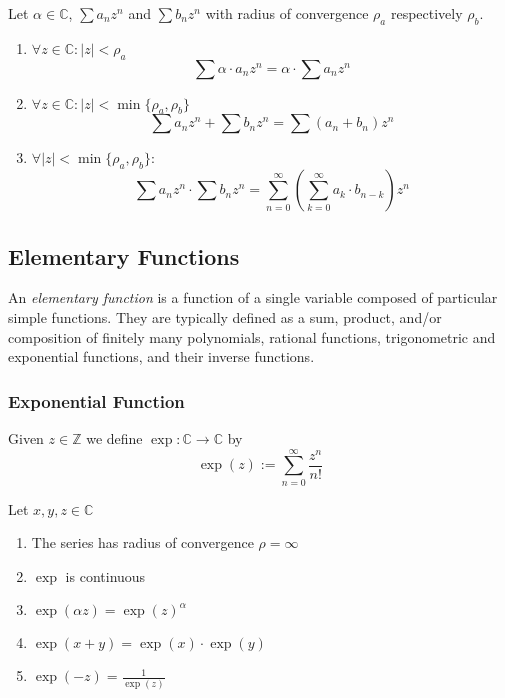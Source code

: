 \begin{theorem}
   Let \(\alpha \in \mathbb{C}\), \(\sum a_n z^n\) and \(\sum b_n z^n\) with radius of convergence \(\rho_a\) respectively \(\rho_b\).
   \begin{enumerate}[label=\roman*, align=Center]
      \item \(\forall z \in \mathbb{C}: \lvert z\rvert < \rho_a\)
         \[\sum \alpha \cdot a_n z^n = \alpha \cdot \sum a_n z^n\]
      \item \(\forall z \in \mathbb{C}: \lvert z\rvert < \min\{\rho_a, \rho_b\}\)
         \[\sum a_n z^n + \sum b_n z^n = \sum (a_n + b_n)z^n\]
      \item \(\forall \lvert z\rvert < \min\{\rho_a, \rho_b\}:\)
         \[\sum a_n z^n \cdot \sum b_n z^n = \sum_{n=0}^\infty\left(\sum_{k=0}^\infty a_k \cdot b_{n-k}\right)z^n\]
   \end{enumerate}
\end{theorem}

\subsection{Elementary Functions}
An \emph{elementary function} is a function of a single variable composed of particular simple functions.
They are typically defined as a sum, product, and/or composition of finitely many polynomials, rational functions, trigonometric and exponential functions, and their inverse functions.

\subsubsection{Exponential Function}
\begin{definition}
   Given \(z \in \mathbb{Z}\) we define \(\exp: \mathbb{C} \to \mathbb{C}\) by
   \[\exp(z) := \sum_{n = 0}^\infty \frac{z^n}{n!}\]
\end{definition}

\begin{proposition}[Properties]
   Let \(x, y, z \in \mathbb{C}\)
   \begin{enumerate}[label=\roman*, align=Center]
      \item The series has radius of convergence \(\rho = \infty\)
      \item \(\exp\) is continuous
      \item \(\exp(\alpha z) = \exp(z)^\alpha\)
      \item \(\exp(x + y) = \exp(x) \cdot \exp(y)\)
      \item \(\exp(-z) = \frac{1}{\exp(z)}\)
   \end{enumerate}
\end{proposition}

